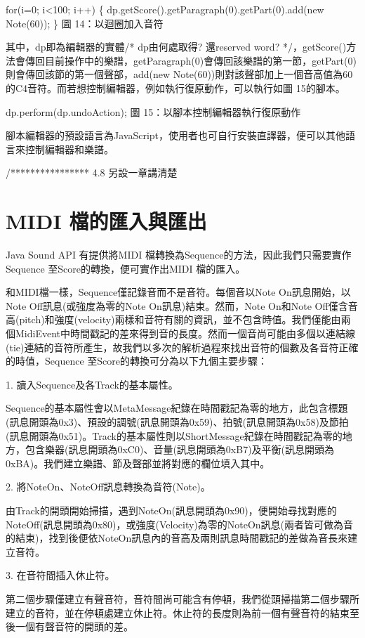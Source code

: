 \documentclass[12pt,a4paper,oneside]{report}
\begin{document}
for(i=0; i<100; i++) \{ 
dp.getScore().getParagraph(0).getPart(0).add(new Note(60));
\}
圖 14：以迴圈加入音符



其中，dp即為編輯器的實體/* dp由何處取得? 還reserved word?  */，getScore()方法會傳回目前操作中的樂譜，getParagraph(0)會傳回該樂譜的第一節，getPart(0)則會傳回該節的第一個聲部，add(new Note(60))則對該聲部加上一個音高值為60的C4音符。而若想控制編輯器，例如執行復原動作，可以執行如圖 15的腳本。

dp.perform(dp.undoAction);
圖 15：以腳本控制編輯器執行復原動作

腳本編輯器的預設語言為JavaScript，使用者也可自行安裝直譯器，便可以其他語言來控制編輯器和樂譜。

 /****************  4.8 另設一章講清楚
\section{MIDI 檔的匯入與匯出}

Java Sound API 有提供將MIDI 檔轉換為Sequence的方法，因此我們只需要實作Sequence 至Score的轉換，便可實作出MIDI 檔的匯入。

和MIDI檔一樣，Sequence僅記錄音而不是音符。每個音以Note On訊息開始，以Note Off訊息(或強度為零的Note On訊息)結束。然而，Note On和Note Off僅含音高(pitch)和強度(velocity)兩樣和音符有關的資訊，並不包含時值。我們僅能由兩個MidiEvent中時間戳記的差來得到音的長度。然而一個音尚可能由多個以連結線(tie)連結的音符所產生，故我們以多次的解析過程來找出音符的個數及各音符正確的時值，Sequence 至Score的轉換可分為以下九個主要步驟： 

1. 讀入Sequence及各Track的基本屬性。 

Sequence的基本屬性會以MetaMessage紀錄在時間戳記為零的地方，此包含標題(訊息開頭為0x3)、預設的調號(訊息開頭為0x59)、拍號(訊息開頭為0x58)及節拍(訊息開頭為0x51)。Track的基本屬性則以ShortMessage紀錄在時間戳記為零的地方，包含樂器(訊息開頭為0xC0)、音量(訊息開頭為0xB7)及平衡(訊息開頭為0xBA)。我們建立樂譜、節及聲部並將對應的欄位填入其中。

2. 將NoteOn、NoteOff訊息轉換為音符(Note)。 

由Track的開頭開始掃描，遇到NoteOn(訊息開頭為0x90)，便開始尋找對應的NoteOff(訊息開頭為0x80)，或強度(Velocity)為零的NoteOn訊息(兩者皆可做為音的結束)，找到後便依NoteOn訊息內的音高及兩則訊息時間戳記的差做為音長來建立音符。

3. 在音符間插入休止符。 

第二個步驟僅建立有聲音符，音符間尚可能含有停頓，我們從頭掃描第二個步驟所建立的音符，並在停頓處建立休止符。休止符的長度則為前一個有聲音符的結束至後一個有聲音符的開頭的差。
\end{document}
